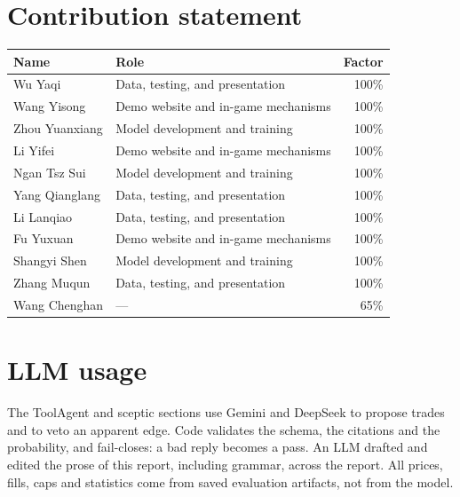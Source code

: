 \documentclass[11pt,a4paper]{article}
\begin{document}
\section*{Contribution statement}
\begin{center}\small
\setlength{\tabcolsep}{6pt}
\begin{tabular}{@{}llr@{}}
\toprule
Name & Role & Factor\\
\midrule
Wu Yaqi & Data, testing, and presentation & 100\%\\
Wang Yisong & Demo website and in-game mechanisms & 100\%\\
Zhou Yuanxiang & Model development and training & 100\%\\
Li Yifei & Demo website and in-game mechanisms & 100\%\\
Ngan Tsz Sui & Model development and training & 100\%\\
Yang Qianglang & Data, testing, and presentation & 100\%\\
Li Lanqiao & Data, testing, and presentation & 100\%\\
Fu Yuxuan & Demo website and in-game mechanisms & 100\%\\
Shangyi Shen & Model development and training & 100\%\\
Zhang Muqun & Data, testing, and presentation & 100\%\\
Wang Chenghan & --- & 65\%\\
\bottomrule
\end{tabular}
\end{center}

\section*{LLM usage}
The ToolAgent and sceptic sections use Gemini and DeepSeek to propose trades
and to veto an apparent edge. Code validates the schema, the citations and
the probability, and fail-closes: a bad reply becomes a pass. An LLM drafted
and edited the prose of this report, including grammar, across the report.
All prices, fills, caps and statistics come from saved evaluation artifacts,
not from the model.
\label{lastbodypage}
\end{document}
